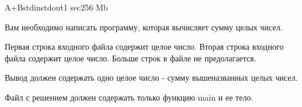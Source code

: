 \begin{problem}{A+B}{stdin}{stdout}{1 sec}{256 Mb}

Вам необходимо написать программу, которая вычисляет сумму целых чисел.

\InputFile

Первая строка входного файла содержит целое число. Вторая строка входного файла содержит целое число. Больше строк в файле не предолагается.

\OutputFile

Вывод должен содержать одно целое число - сумму вышеназванных целых чисел.
\Example

\begin{example}
%
\end{example}

\Note

Файл с решением должен содержать только функцию main и ее тело.

\end{problem}